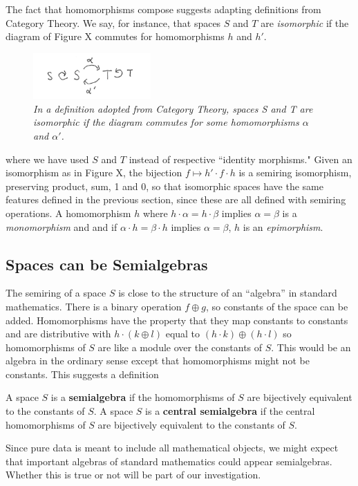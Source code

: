 \documentclass[11pt]{article}
\begin{document}
The fact that homomorphisms compose suggests adapting definitions from Category Theory.  
We say, for instance, that spaces $S$ and $T$ are {\it isomorphic} if the diagram of Figure X commutes for homomorphisms 
$h$ and $h'$.  
\begin{figure}[h]
\centering
\includegraphics[width=0.4\textwidth]{isomorphism.png}
\caption{{\it In a definition adopted from Category Theory, spaces S and T are isomorphic if the diagram commutes for some homomorphisms $\alpha$ and $\alpha'$.}}
\end{figure}
where we have used $S$ and $T$ instead of respective ``identity morphisms."  Given an isomorphism as in Figure X, the bijection $f\mapsto h'\cdot f \cdot h$ is 
a semiring isomorphism, preserving product, sum, 1 and 0, so that isomorphic spaces have the same features defined in the previous section, since 
these are all defined with semiring operations.  A homomorphism $h$ where $h\cdot \alpha=h\cdot \beta$ implies $\alpha=\beta$ is a {\it monomorphism} and 
and if $\alpha\cdot h=\beta\cdot h$ implies $\alpha=\beta$, $h$ is an {\it epimorphism}.  

\subsection{Spaces can be Semialgebras} 

The semiring of a space $S$ is close to the structure of an ``algebra'' in standard mathematics.  There is a binary operation $f\oplus g$, so 
constants of the space can be added.  Homomorphisms have the property that they map constants to constants and are distributive with 
$h\cdot (k\oplus l)$ equal to $(h\cdot k)\oplus (h\cdot l)$ so homomorphisms of $S$ are like a module over the constants of $S$.  This would 
be an algebra in the ordinary sense except that homomorphisms might not be constants.  This suggests a definition 

\begin{definition}
A space $S$ is a {\bf semialgebra} if the homomorphisms of $S$ are bijectively equivalent to the constants of $S$.
A space $S$ is a {\bf central semialgebra} if the central homomorphisms of $S$ are bijectively equivalent to the constants of $S$.
\end{definition}
\noindent Since pure data is meant to include all mathematical objects, we might expect that important algebras of standard 
mathematics could appear semialgebras.  Whether this is true or not will be part of our investigation. 
\end{document}
